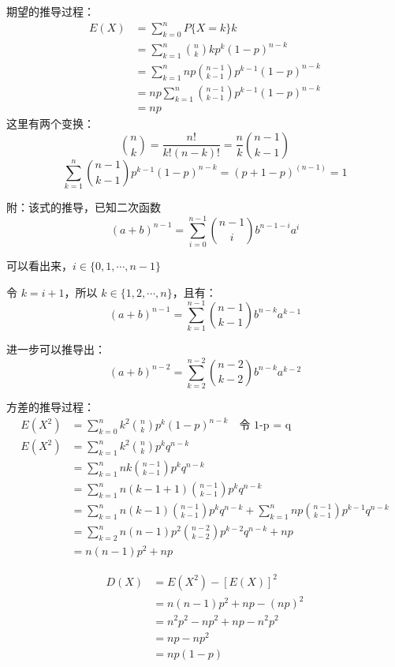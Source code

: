 \documentclass[12pt]{article}
\begin{document}
期望的推导过程：
\begin{align*}
    E(X) &= \sum_{k=0}^nP\{X=k\}k \\
    &= \sum_{k=1}^n \binom{n}{k}kp^{k}(1-p)^{n-k} \\
    &= \sum_{k=1}^nnp\binom{n-1}{k-1}p^{k-1}(1-p)^{n-k} \\
    &= np\sum_{k=1}^n\binom{n-1}{k-1}p^{k-1}(1-p)^{n-k} \\
    &= np
\end{align*}
这里有两个变换：
$$
\binom{n}{k} = \frac{n!}{k!(n-k)!} = \frac{n}{k}\binom{n-1}{k-1}
$$
$$
\sum_{k=1}^n\binom{n-1}{k-1}p^{k-1}(1-p)^{n-k} = (p+1-p)^{(n-1)} = 1
$$
\begin{framed}  
附：该式的推导，已知二次函数
$$
(a+b)^{n-1} = \sum_{i=0}^{n-1}\binom{n-1}{i}b^{n-1-i}a^i
$$

可以看出来，$i \in \{0, 1, \cdots, n-1\}$

令 $k=i+1$，所以 $k \in \{1, 2, \cdots, n\}$，且有：
$$
(a+b)^{n-1} = \sum_{k=1}^{n-1}\binom{n-1}{k-1}b^{n-k}a^{k-1}
$$

进一步可以推导出：
$$
(a+b)^{n-2} = \sum_{k=2}^{n-2} \binom{n-2}{k-2}b^{n-k}a^{k-2}
$$
\end{framed}  

方差的推导过程：
\begin{align*}
    E(X^2) &= \sum_{k=0}^n k^2\binom{n}{k}p^k(1-p)^{n-k}  \quad \text{令 1-p = q}\\
    E(X^2) &= \sum_{k=1}^n k^2\binom{n}{k}p^kq^{n-k} \\
    &= \sum_{k=1}^n nk\binom{n-1}{k-1}p^kq^{n-k} \\
    &= \sum_{k=1}^n n(k-1+1)\binom{n-1}{k-1}p^kq^{n-k} \\
    &= \sum_{k=1}^n n(k-1)\binom{n-1}{k-1}p^kq^{n-k} + \sum_{k=1}^n np\binom{n-1}{k-1}p^{k-1}q^{n-k} \\
    &= \sum_{k=2}^n n(n-1)p^2\binom{n-2}{k-2}p^{k-2}q^{n-k} + np \\
    &= n(n-1)p^2 + np
\end{align*}

\begin{align*}
    D(X) &= E(X^2) - [E(X)]^2 \\
         &= n(n-1)p^2 + np - (np)^2 \\
         &= n^2p^2 - np^2 + np - n^2p^2\\
         &= np - np^2 \\
         &= np(1-p)
\end{align*}
\end{document}
